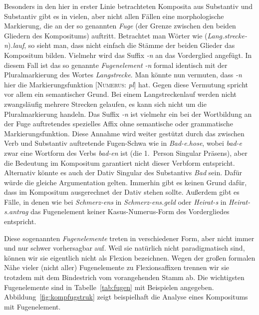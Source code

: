 Besonders in den hier in erster Linie betrachteten Komposita aus Substantiv und Substantiv gibt es in vielen, aber nicht allen Fällen eine morphologische Markierung, die an der so genannten \textit{Fuge} (der Grenze zwischen den beiden Gliedern des Kompositums) auftritt.
Betrachtet man Wörter wie (\textit{Lang.strecke-n})\textit{.lauf}, so sieht man, dass nicht einfach die Stämme der beiden Glieder das Kompositum bilden.
Vielmehr wird das Suffix \textit{-n} an das Vorderglied angefügt.
In diesem Fall ist das so genannte \textit{Fugenelement} \textit{-n} formal identisch mit der Pluralmarkierung des Wortes \textit{Langstrecke}.
Man könnte nun vermuten, dass \textit{-n} hier die Markierungsfunktion [\textsc{Numerus}: \textit{pl}] hat.
Gegen diese Vermutung spricht vor allem ein semantischer Grund.
Bei einem Langstreckenlauf werden nicht zwangsläufig mehrere Strecken gelaufen, es kann sich nicht um die Pluralmarkierung handeln.
Das Suffix \textit{-n} ist vielmehr ein bei der Wortbildung an der Fuge auftretendes spezielles Affix ohne semantische oder grammatische Markierungsfunktion.
Diese Annahme wird weiter gestützt durch das zwischen Verb und Substantiv auftretende Fugen-Schwa wie in \textit{Bad-e.hose}, wobei \textit{bad-e} zwar eine Wortform des Verbs \textit{bad-en} ist (\zB die 1.~Person Singular Präsens), aber die Bedeutung im Kompositum garantiert nicht dieser Verbform entspricht.
Alternativ könnte es auch der Dativ Singular des Substantivs \textit{Bad} sein.
Dafür würde die gleiche Argumentation gelten.
Immerhin gibt es keinen Grund dafür, dass im Kompositum ausgerechnet der Dativ stehen sollte.
Außerdem gibt es Fälle, in denen wie bei \textit{\Ast Schmerz-ens} in \textit{Schmerz-ens.geld} oder \textit{\Ast Heirat-s} in \textit{Heirat-s.antrag} das Fugenelement keiner Kasus-Numerus-Form des Vordergliedes entspricht.

Diese sogenannten \textit{Fugenelemente} treten in verschiedener Form, aber nicht immer und nur schwer vorhersagbar auf.
Weil sie natürlich nicht paradigmatisch sind, können wir sie eigentlich nicht als Flexion bezeichnen.
Wegen der großen formalen Nähe vieler (nicht aller) Fugenelemente zu Flexionsaffixen trennen wir sie trotzdem mit dem Bindestrich vom vorangehenden Stamm ab.
Die wichtigsten Fugenelemente sind in Tabelle~\ref{tab:fugen} mit Beispielen angegeben.
Abbildung~\ref{fig:kompfugstruk} zeigt beispielhaft die Analyse eines Kompositums mit Fugenelement.

